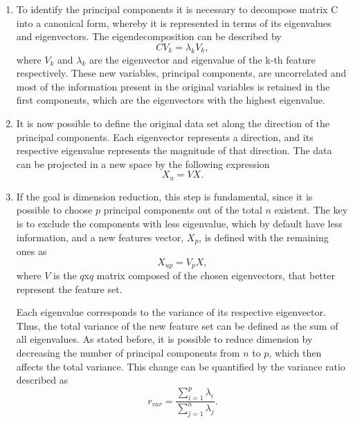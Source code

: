 \begin{description}
\begin{enumerate}
    \item To identify the principal components it is necessary to decompose matrix C into a canonical form, whereby it is represented in terms of its eigenvalues and eigenvectors. The eigendecomposition can be described by
    \begin{equation}
        \label{eigendecompositionPCA}
        CV_k = \lambda_k V_k,
    \end{equation} 
    where $V_k$ and $\lambda_k$ are the eigenvector and eigenvalue of the k-th feature respectively.
   These new variables, principal components, are uncorrelated and most of the information present in the original variables is retained in the first components, which are the eigenvectors with the highest eigenvalue.
   
   \item It is now possible to define the original data set along the direction of the principal components. Each eigenvector represents a direction, and its respective eigenvalue represents the magnitude of that direction. The data can be projected in a new space by the following expression
   \begin{equation}
       \label{newSpaceFeatures}
        X_u= VX .
   \end{equation}
   
    \item If the goal is dimension reduction, this step is fundamental, since it is possible to choose $p$ principal components out of the total $n$ existent. The key is to exclude the components with less eigenvalue, which by default have less information, and a new features vector, $X_p$, is defined with the remaining ones as
    \begin{equation}
        \label{featureVectorPCA}
         X_{up}= V_pX,        
    \end{equation}
    where $V$ is the $q$x$q$ matrix composed of the chosen eigenvectors, that better represent the feature set.

    Each eigenvalue corresponds to the variance of its respective eigenvector. Thus, the total variance of the new feature set can be defined as the sum of all eigenvalues. As stated before, it is possible to reduce dimension by decreasing the number of principal components from $n$ to $p$, which then affects the total variance. This change can be quantified by the variance ratio described as
    \begin{equation}
        \label{varianceChangeWReduction}
        r_{var} = \frac{\sum_{i=1}^p \lambda_i}{\sum_{j=1}^n \lambda_j} .
    \end{equation}

\end{enumerate}

\end{description}

